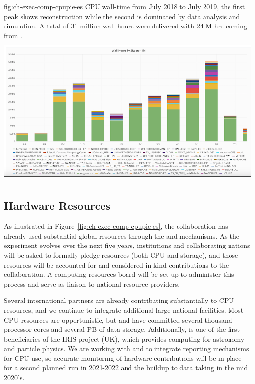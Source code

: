 \begin{dunefigure}
{fig:ch-exec-comp-cpupie-es}
{CPU wall-time from July 2018 to July 2019, the first peak shows   reconstruction while the second is dominated by data analysis and  simulation. A total of 31 million wall-hours were delivered with 24 M-hrs coming from \fnal.}
\includegraphics[height=3in]{graphics/comp-ComputingLastYear.png}
\end{dunefigure}


\subsection{Hardware Resources} 
\label{sec:exec-comp-hi}

As illustrated in Figure~\ref{fig:ch-exec-comp-cpupie-es}, the  collaboration has already used substantial global resources through the  and  mechanisms. As the experiment evolves over the next five years, institutions and collaborating nations will be asked to formally pledge resources (both CPU and storage), and those resources will be accounted for and considered in-kind contributions to the collaboration.  A   computing resources board  will be set up to administer this process and serve as liaison to national resource providers. 

Several international partners are already contributing substantially to CPU resources, and we continue to  integrate additional large national facilities. Most CPU resources are opportunistic, but  and  have committed several thousand processor cores and several PB of data storage. Additionally,   is one of the first beneficiaries of the IRIS project (UK), which provides computing for astronomy and particle physics.  
We are working with  and  to integrate reporting mechanisms for CPU use, so accurate monitoring of hardware contributions will be in place for a second planned   run in 2021-2022 and the buildup to data taking in the mid 2020's. 

